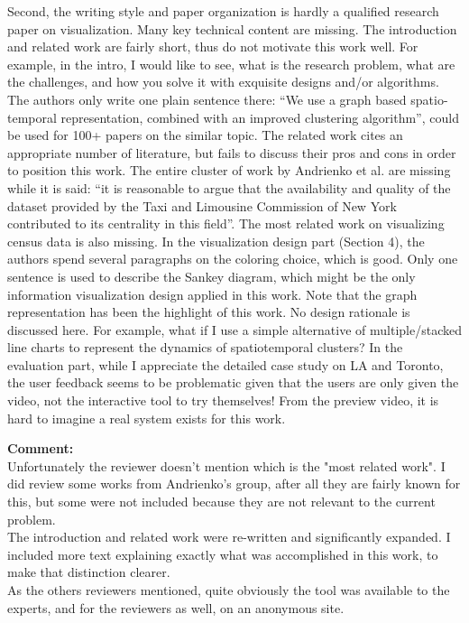 \documentclass{article}
\newcommand{\reply}[1]{\begin{tcolorbox}\noindent\textbf{Comment:}\\#1\hfill\end{tcolorbox}}
\begin{document}
\begin{itemize}
{    Second, the writing style and paper organization is hardly a qualified
    research paper on visualization. Many key technical content are missing. The
    introduction and related work are fairly short, thus do not motivate this
    work well. For example, in the intro, I would like to see, what is the
    research problem, what are the challenges, and how you solve it with
    exquisite designs and/or algorithms. The authors only write one plain
    sentence there: ``We use a graph based spatio- temporal representation,
    combined with an improved clustering algorithm'', could be used for 100+
    papers on the similar topic. The related work cites an appropriate number of
    literature, but fails to discuss their pros and cons in order to position
    this work. The entire cluster of work by Andrienko et al. are missing while
    it is said: ``it is reasonable to argue that the availability and quality of
    the dataset provided by the Taxi and Limousine Commission of New York
    contributed to its centrality in this field''. The most related work on
    visualizing census data is also missing. In the visualization design part
    (Section 4), the authors spend several paragraphs on the coloring choice,
    which is good. Only one sentence is used to describe the Sankey diagram,
    which might be the only information visualization design applied in this
    work. Note that the graph representation has been the highlight of this
    work. No design rationale is discussed here. For example, what if I use a
    simple alternative of multiple/stacked line charts to represent the dynamics
    of spatiotemporal clusters? In the evaluation part, while I appreciate the
    detailed case study on LA and Toronto, the user feedback seems to be
    problematic given that the users are only given the video, not the
    interactive tool to try themselves! From the preview video, it is hard to
    imagine a real system exists for this work.


    \reply{Unfortunately the reviewer doesn't mention which is the "most related
    work". I did review some works from Andrienko's group, after all they are
    fairly known for this, but some were not included because they are not
    relevant to the current problem. \\The introduction and related work were
    re-written and significantly expanded. I included more text explaining
    exactly what was accomplished in this work, to make that distinction
    clearer. \\ As the others reviewers mentioned, quite obviously the tool was
    available to the experts, and for the reviewers as well, on an anonymous
    site.}

}
\end{itemize}
\end{document}
